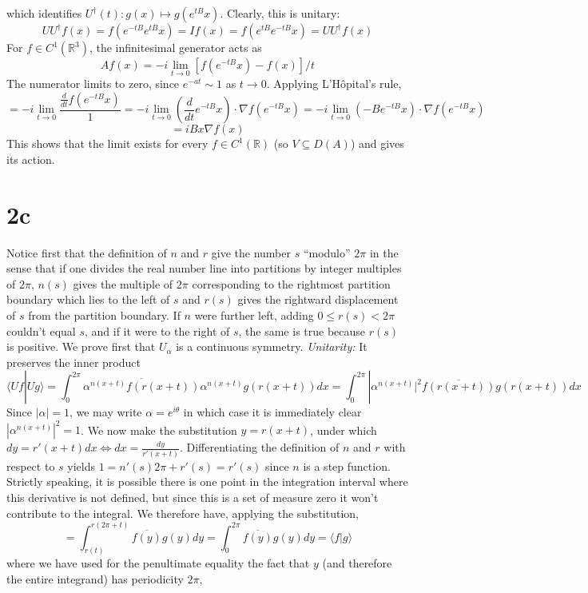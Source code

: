 \documentclass{article}
\begin{document}
which identifies $U^{\dagger}(t): g(x)\mapsto g(e^{tB}x)$.
Clearly, this is unitary:
\[
  UU^{\dagger}f(x)=f(e^{-tB}e^{tB}x)=If(x)=f(e^{tB}e^{-tB}x)=UU^{\dagger}f(x)
\]
For $f\in C^{1}(\mathbb{R}^{3})$, the infinitesimal generator acts as
\[
  Af(x)=-i\lim_{t\to 0}[f(e^{-tB}x)-f(x)]/t
\]
The numerator limits to zero, since $e^{-at}\sim1$ as $t\to 0$.
Applying L'H\^opital's rule,
\[
  =-i\lim_{t\to 0}\frac{\frac{d}{dt}f(e^{-tB}x)}{1}
  =-i\lim_{t\to 0}\left( \frac{d}{dt}e^{-tB}x \right)\cdot\nabla f(e^{-tB}x)
  =-i\lim_{t\to 0}\left(-Be^{-tB}x\right)\cdot\nabla f(e^{-tB}x)
\]
\[
  =iBx\nabla f(x)
\]
This shows that the limit exists for every $f\in C^{1}(\mathbb{R})$ (so $V\subseteq D(A)$) and gives its action.

\section*{2c} %
Notice first that the definition of $n$ and $r$ give the number $s$ ``modulo'' $2\pi$ in the sense that if one divides the real number
line into partitions by integer multiples of $2\pi$, $n(s)$ gives the multiple of $2\pi$ corresponding to the rightmost partition boundary
which lies to the left of $s$ and $r(s)$ gives the rightward displacement of $s$ from the partition boundary.
If $n$ were further left, adding $0\leq r(s)< 2\pi$ couldn't equal $s$, and if it were to the right of $s$, the same is true because $r(s)$
is positive.
We prove first that $U_{\alpha}$ is a continuous symmetry.\newline
\textit{Unitarity:}
It preserves the inner product
\[
  \langle Uf|Ug \rangle
  =\int_{0}^{2\pi}\overline{\alpha^{n(x+t)}f(r(x+t))}\alpha^{n(x+t)}g(r(x+t))dx
  =\int_{0}^{2\pi}|\alpha^{n(x+t)}|^{2}\overline{f(r(x+t))}g(r(x+t))dx
\]
Since $|\alpha|=1$, we may write $\alpha=e^{i\theta}$ in which case it is immediately clear $|\alpha^{n(x+t)}|^{2}=1$.
We now make the substitution $y=r(x+t)$, under which $dy=r'(x+t)dx\Leftrightarrow dx=\frac{dy}{r'(x+t)}$.
Differentiating the definition of $n$ and $r$ with respect to $s$ yields $1=n'(s)2\pi+r'(s)=r'(s)$ since $n$ is a step function.
Strictly speaking, it is possible there is one point in the integration interval where this derivative is not defined,
but since this is a set of measure zero it won't contribute to the integral. %
We therefore have, applying the substitution,
\[
  =\int_{r(t)}^{r(2\pi+t)}\overline{f(y)}g(y)dy=\int_{0}^{2\pi}\overline{f(y)}g(y)dy=\langle f |g\rangle
\]
where we have used for the penultimate equality the fact that $y$ (and therefore the entire integrand) has periodicity $2\pi$,
\end{document}
